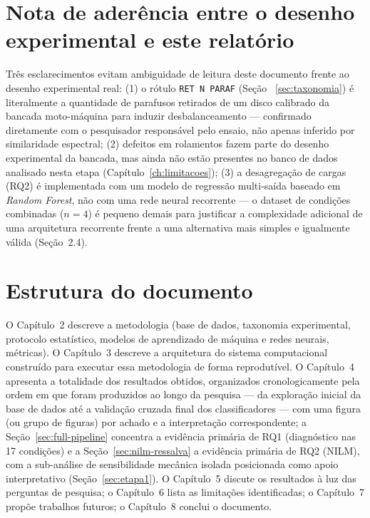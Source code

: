 \documentclass[12pt,a4paper]{report}
\begin{document}
\section{Nota de aderência entre o desenho experimental e este relatório}

Três esclarecimentos evitam ambiguidade de leitura deste documento frente ao
desenho experimental real: (1) o rótulo \texttt{RET~N~PARAF} (Seção~
\ref{sec:taxonomia}) é literalmente a quantidade de parafusos retirados de um
disco calibrado da bancada moto-máquina para induzir desbalanceamento —
confirmado diretamente com o pesquisador responsável pelo ensaio, não apenas
inferido por similaridade espectral; (2) defeitos em rolamentos fazem parte
do desenho experimental da bancada, mas ainda não estão presentes no banco de
dados analisado nesta etapa (Capítulo~\ref{ch:limitacoes}); (3) a
desagregação de cargas (RQ2) é implementada com um modelo de regressão
multi-saída baseado em \emph{Random Forest}, não com uma rede neural
recorrente — o dataset de condições combinadas ($n=4$) é pequeno demais para
justificar a complexidade adicional de uma arquitetura recorrente frente a
uma alternativa mais simples e igualmente válida (Seção~2.4).

\section{Estrutura do documento}

O Capítulo~2 descreve a metodologia (base de dados, taxonomia experimental,
protocolo estatístico, modelos de aprendizado de máquina e redes neurais,
métricas). O Capítulo~3 descreve a arquitetura do sistema computacional
construído para executar essa metodologia de forma reprodutível. O
Capítulo~4 apresenta a totalidade dos resultados obtidos, organizados
cronologicamente pela ordem em que foram produzidos ao longo da pesquisa —
da exploração inicial da base de dados até a validação cruzada final dos
classificadores — com uma figura (ou grupo de figuras) por achado e a
interpretação correspondente; a Seção~\ref{sec:full-pipeline} concentra a
evidência primária de RQ1 (diagnóstico nas 17 condições) e a
Seção~\ref{sec:nilm-ressalva} a evidência primária de RQ2 (NILM), com a
sub-análise de sensibilidade mecânica isolada posicionada como apoio
interpretativo (Seção~\ref{sec:etapa1}). O Capítulo~5 discute os resultados à
luz das perguntas de pesquisa; o Capítulo~6 lista as limitações
identificadas; o Capítulo~7 propõe trabalhos futuros; o Capítulo~8 conclui o
documento.
\end{document}
